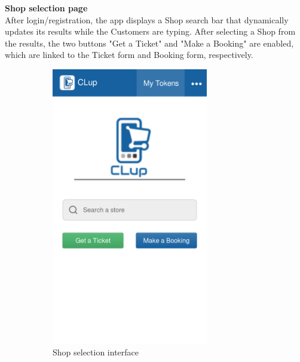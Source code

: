 \pagebreak
\textbf{Shop selection page}\\
\label{page:home}
After login/registration, the app displays a Shop search bar that dynamically updates its results while the Customers are typing. After selecting a Shop from the results, the two buttons "Get a Ticket" and "Make a Booking" are enabled, which are linked to the Ticket form and Booking form, respectively.
\begin{figure}[H]
    \begin{subfigure}{0.5\textwidth}
        \centering
        \includegraphics[width=0.75\textwidth]{Images/home-mockup.png}
        \caption{Shop selection interface}
    \end{subfigure}%
    \begin{subfigure}{0.5\textwidth}

\end{subfigure}
\end{figure}

